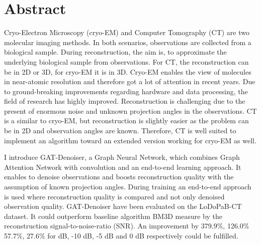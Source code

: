 \chapter{Abstract}


Cryo-Electron Microscopy (cryo-EM) and Computer Tomography (CT) 
are two molecular imaging methods.
In both scenarios, observations are collected from a biological sample.
During reconstruction, the aim is, to approximate the underlying biological sample from observations.
For CT, the reconstruction can be in 2D or 3D, for cryo-EM it is in 3D.
Cryo-EM enables the view of molecules in near-atomic resolution and therefore got a lot of attention in recent years.
Due to ground-breaking improvements regarding hardware and data processing, the field of research
has highly improved.
Reconstruction is challenging due to the present of enormous noise and unknown projection angles in the observations.
CT is a similar to cryo-EM, but reconstruction is slightly easier
as the problem can be in 2D and observation angles are known. 
Therefore, CT is well suited to implement an algorithm toward an extended version working for cryo-EM as well.

I introduce GAT-Denoiser, a Graph Neural Network, which combines Graph Attention Network with convolution 
and an end-to-end learning approach. 
It enables to denoise observations and boosts reconstruction quality with the assumption of known projection angles.
During training an end-to-end approach is used where reconstruction quality is compared and not only
denoised observation quality.
GAT-Denoiser have been evaluated on the LoDoPaB-CT dataset.
It could outperform baseline algorithm BM3D measure by the reconstruction
signal-to-noise-ratio (SNR). An improvement by 379.9\%, 126.0\% 57.7\%, 27.6\% for  dB, -10 dB, -5 dB and 0 dB respectively
could be fulfilled. 

